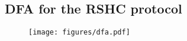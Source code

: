 \begin{appendices}

\section{DFA for the RSHC protocol}
\label{app:dfa}

\begin{figure}[h]
  \centering
  \texttt{[image: figures/dfa.pdf]}\\
\end{figure}

\end{appendices} 